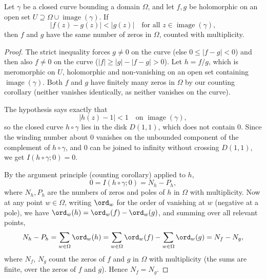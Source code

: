 \begin{center}
\end{center}

\begin{theorem}
    Let $\gamma$ be a closed curve bounding a domain $\Omega$, and let $f, g$ be holomorphic on an open set $U \supseteq \Omega \cup \operatorname{image}(\gamma)$. If
    $$
    |f(z) - g(z)| < |g(z)| \quad \text{for all } z \in \operatorname{image}(\gamma),
    $$
    then $f$ and $g$ have the same number of zeros in $\Omega$, counted with multiplicity.
\end{theorem}
\begin{proof}
    The strict inequality forces $g \neq 0$ on the curve (else $0 \leq |f - g| < 0$) and then also $f \neq 0$ on the curve ($|f| \geq |g| - |f - g| > 0$). Let $h = f/g$, which is meromorphic on $U$, holomorphic and non-vanishing on an open set containing $\operatorname{image}(\gamma)$. Both $f$ and $g$ have finitely many zeros in $\Omega$ by our counting corollary (neither vanishes identically, as neither vanishes on the curve).

    The hypothesis says exactly that
    $$
    |h(z) - 1| < 1 \quad \text{on } \operatorname{image}(\gamma),
    $$
    so the closed curve $h \circ \gamma$ lies in the disk $D(1, 1)$, which does not contain $0$. Since the winding number about $0$ vanishes on the unbounded component of the complement of $h \circ \gamma$, and $0$ can be joined to infinity without crossing $D(1, 1)$, we get $I(h \circ \gamma; 0) = 0$.

    By the argument principle (counting corollary) applied to $h$,
    $$
    0 = I(h \circ \gamma; 0) = N_h - P_h,
    $$
    where $N_h, P_h$ are the numbers of zeros and poles of $h$ in $\Omega$ with multiplicity. Now at any point $w \in \Omega$, writing $\ord_w$ for the order of vanishing at $w$ (negative at a pole), we have $\ord_w(h) = \ord_w(f) - \ord_w(g)$, and summing over all relevant points,
    $$
    N_h - P_h = \sum_{w \in \Omega} \ord_w(h) = \sum_{w \in \Omega} \ord_w(f) - \sum_{w \in \Omega} \ord_w(g) = N_f - N_g,
    $$
    where $N_f$, $N_g$ count the zeros of $f$ and $g$ in $\Omega$ with multiplicity (the sums are finite, over the zeros of $f$ and $g$). Hence $N_f = N_g$.
\end{proof}

